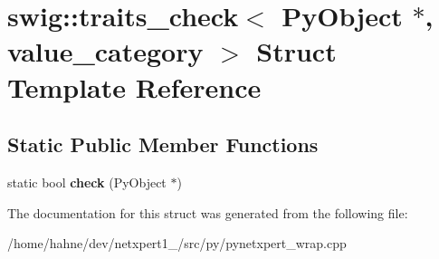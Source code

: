 \hypertarget{structswig_1_1traits__check_3_01PyObject_01_5_00_01value__category_01_4}{}\section{swig\+:\+:traits\+\_\+check$<$ Py\+Object $\ast$, value\+\_\+category $>$ Struct Template Reference}
\label{structswig_1_1traits__check_3_01PyObject_01_5_00_01value__category_01_4}
\subsection*{Static Public Member Functions}
\begin{DoxyCompactItemize}
\item 
static bool {\bfseries check} (Py\+Object $\ast$)\hypertarget{structswig_1_1traits__check_3_01PyObject_01_5_00_01value__category_01_4_a4242a4f3371216574fd46f69b5fa0a23}{}\label{structswig_1_1traits__check_3_01PyObject_01_5_00_01value__category_01_4_a4242a4f3371216574fd46f69b5fa0a23}

\end{DoxyCompactItemize}


The documentation for this struct was generated from the following file\+:\begin{DoxyCompactItemize}
\item 
/home/hahne/dev/netxpert1\+\_/src/py/pynetxpert\+\_\+wrap.\+cpp\end{DoxyCompactItemize}
